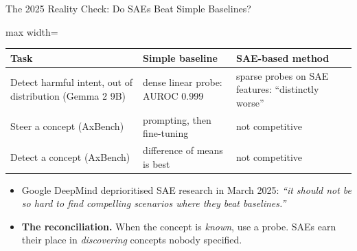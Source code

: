 \begin{frame}{The 2025 Reality Check: Do SAEs Beat Simple Baselines?}
    \begin{center}
    \small
    \renewcommand{\arraystretch}{1.18}
    \begin{adjustbox}{max width=\linewidth}\begin{tabular}{>{\raggedright\arraybackslash}p{4.5cm}>{\raggedright\arraybackslash}p{4.0cm}>{\raggedright\arraybackslash}p{4.2cm}}
        \toprule
        \textbf{Task} & \textbf{Simple baseline} & \textbf{SAE-based method} \\
        \midrule
        Detect harmful intent, out of distribution (Gemma 2 9B) & dense linear probe: AUROC 0.999 & sparse probes on SAE features: ``distinctly worse'' \\
        Steer a concept (AxBench) & prompting, then fine-tuning & not competitive \\
        Detect a concept (AxBench) & difference of means is best & not competitive \\
        \bottomrule
    \end{tabular}\end{adjustbox}
    \end{center}
    \begin{itemize}\itemsep0.4em
        \item Google DeepMind deprioritised SAE research in March 2025: \emph{``it should not be so hard to find compelling scenarios where they beat baselines.''}
        \item \textbf{The reconciliation.} When the concept is \emph{known}, use a probe. SAEs earn their place in \emph{discovering} concepts nobody specified.
    \end{itemize}
\end{frame}

